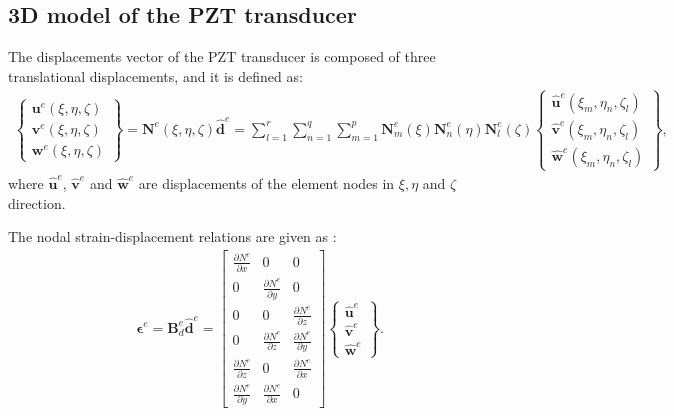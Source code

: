 \documentclass[sensors,article,submit,moreauthors,pdftex]{Definitions/mdpi}
\begin{document}
\subsection{3D model of the PZT transducer}
\label{sec:3D_SEM}
The displacements vector of the PZT transducer is composed of three translational displacements, and it is defined as:
\begin{eqnarray}
\left \{ \begin{array}{c}
\textbf{u}^e(\xi,\eta,\zeta) \\
\textbf{v}^e(\xi,\eta,\zeta) \\
\textbf{w}^e(\xi,\eta,\zeta)
\end{array} \right\}
= \textbf{N}^e(\xi,\eta, \zeta)\widehat{\textbf{d}}^e
= \sum_{l=1}^r\sum_{n=1}^q\sum_{m=1}^p\textbf{N}_m^e(\xi)\textbf{N}_n^e(\eta)\textbf{N}_l^e(\zeta)
\left \{ \begin{array}{c}
\widehat{\textbf{u}}^e(\xi_m,\eta_n,\zeta_l) \\
\widehat{\textbf{v}}^e(\xi_m,\eta_n,\zeta_l) \\
\widehat{\textbf{w}}^e(\xi_m,\eta_n,\zeta_l)
\end{array} \right\},
\label{eq:3D_displ}
\end{eqnarray}
where \(\widehat{\textbf{u}}^e\), \(\widehat{\textbf{v}}^e\) and 
\(\widehat{\textbf{w}}^e\) are displacements of the element nodes in \(\xi,\eta\) and \(\zeta\) direction.

The nodal strain-displacement relations are given as \cite{kudela20093d}:
\begin{eqnarray}
\boldsymbol{\epsilon}^e=\textbf{B}_{d}^e\widehat{\textbf{d}}^e=
\left [
\begin{array}{ccc}
\frac{\partial N^e}{\partial x} & 0 & 0\\
0 & \frac{\partial N^e}{\partial y} & 0\\
0 & 0 & \frac{\partial N^e}{\partial z}\\
0 & \frac{\partial N^e}{\partial z} & \frac{\partial N^e}{\partial y}\\
\frac{\partial N^e}{\partial z} & 0 & \frac{\partial N^e}{\partial x}\\
\frac{\partial N^e}{\partial y} & \frac{\partial N^e}{\partial x} & 0
\end{array} \right]
\left \{ \begin{array}{c}
\widehat{\textbf{u}}^e \\
\widehat{\textbf{v}}^e \\
\widehat{\textbf{w}}^e
\end{array} \right\}.
\end{eqnarray}
\end{document}
